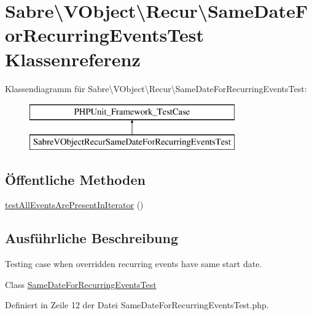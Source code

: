 \hypertarget{class_sabre_1_1_v_object_1_1_recur_1_1_same_date_for_recurring_events_test}{}\section{Sabre\textbackslash{}V\+Object\textbackslash{}Recur\textbackslash{}Same\+Date\+For\+Recurring\+Events\+Test Klassenreferenz}
\label{class_sabre_1_1_v_object_1_1_recur_1_1_same_date_for_recurring_events_test}
Klassendiagramm für Sabre\textbackslash{}V\+Object\textbackslash{}Recur\textbackslash{}Same\+Date\+For\+Recurring\+Events\+Test\+:\begin{figure}[H]
\begin{center}
\leavevmode
\includegraphics[height=2.000000cm]{class_sabre_1_1_v_object_1_1_recur_1_1_same_date_for_recurring_events_test}
\end{center}
\end{figure}
\subsection*{Öffentliche Methoden}
\begin{DoxyCompactItemize}
\item 
\mbox{\hyperlink{class_sabre_1_1_v_object_1_1_recur_1_1_same_date_for_recurring_events_test_afad143de25ac3338f7c1de111795f804}{test\+All\+Events\+Are\+Present\+In\+Iterator}} ()
\end{DoxyCompactItemize}


\subsection{Ausführliche Beschreibung}
Testing case when overridden recurring events have same start date.

Class \mbox{\hyperlink{class_sabre_1_1_v_object_1_1_recur_1_1_same_date_for_recurring_events_test}{Same\+Date\+For\+Recurring\+Events\+Test}} 

Definiert in Zeile 12 der Datei Same\+Date\+For\+Recurring\+Events\+Test.\+php.



